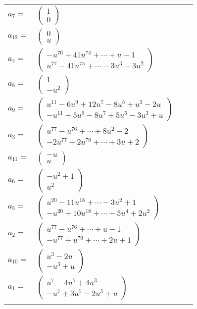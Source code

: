 \documentclass[1p]{elsarticle_modified}
\theoremstyle{definition}
\begin{document}
\begin{tabular}{m{7pt} m{180pt} m{7pt} m{180pt} }
\flushright $a_{7}=$&$\begin{pmatrix}1\\0\end{pmatrix}$ \\
\flushright $a_{12}=$&$\begin{pmatrix}0\\u\end{pmatrix}$ \\
\flushright $a_{4}=$&$\begin{pmatrix}- u^{76}+41 u^{74}+\cdots+u-1\\u^{77}-41 u^{75}+\cdots-3 u^3-3 u^2\end{pmatrix}$ \\
\flushright $a_{8}=$&$\begin{pmatrix}1\\- u^2\end{pmatrix}$ \\
\flushright $a_{9}=$&$\begin{pmatrix}u^{11}-6 u^9+12 u^7-8 u^5+u^3-2 u\\- u^{11}+5 u^9-8 u^7+5 u^5-3 u^3+u\end{pmatrix}$ \\
\flushright $a_{3}=$&$\begin{pmatrix}u^{77}- u^{76}+\cdots+8 u^2-2\\-2 u^{77}+2 u^{76}+\cdots+3 u+2\end{pmatrix}$ \\
\flushright $a_{11}=$&$\begin{pmatrix}- u\\u\end{pmatrix}$ \\
\flushright $a_{6}=$&$\begin{pmatrix}- u^2+1\\u^2\end{pmatrix}$ \\
\flushright $a_{5}=$&$\begin{pmatrix}u^{20}-11 u^{18}+\cdots-3 u^2+1\\- u^{20}+10 u^{18}+\cdots-5 u^4+2 u^2\end{pmatrix}$ \\
\flushright $a_{2}=$&$\begin{pmatrix}u^{77}- u^{76}+\cdots+u-1\\- u^{77}+u^{76}+\cdots+2 u+1\end{pmatrix}$ \\
\flushright $a_{10}=$&$\begin{pmatrix}u^3-2 u\\- u^3+u\end{pmatrix}$ \\
\flushright $a_{1}=$&$\begin{pmatrix}u^7-4 u^5+4 u^3\\- u^7+3 u^5-2 u^3+u\end{pmatrix}$\\&\end{tabular}
\end{document}
